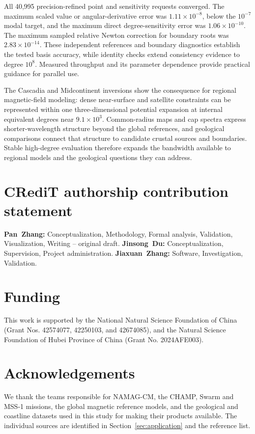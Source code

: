 ﻿\documentclass[11pt,a4paper]{article}
\begin{document}
All 40,995 precision-refined point and sensitivity requests converged. The maximum scaled value or angular-derivative error was $1.11\times10^{-8}$, below the $10^{-7}$ modal target, and the maximum direct degree-sensitivity error was $1.06\times10^{-10}$. The maximum sampled relative Newton correction for boundary roots was $2.83\times10^{-14}$. These independent references and boundary diagnostics establish the tested basis accuracy, while identity checks extend consistency evidence to degree $10^8$. Measured throughput and its parameter dependence provide practical guidance for parallel use.

The Cascadia and Midcontinent inversions show the consequence for regional magnetic-field modeling: dense near-surface and satellite constraints can be represented within one three-dimensional potential expansion at internal equivalent degrees near $9.1\times10^3$. Common-radius maps and cap spectra express shorter-wavelength structure beyond the global references, and geological comparisons connect that structure to candidate crustal sources and boundaries. Stable high-degree evaluation therefore expands the bandwidth available to regional models and the geological questions they can address.

\section*{CRediT authorship contribution statement}
\textbf{Pan~Zhang:} Conceptualization, Methodology, Formal analysis, Validation, Visualization, Writing -- original draft.
\textbf{Jinsong~Du:} Conceptualization, Supervision, Project administration.
\textbf{Jiaxuan~Zhang:} Software, Investigation, Validation.

\section*{Funding}
This work is supported by the National Natural Science Foundation of China (Grant Nos. 42574077, 42250103, and 42674085), and the Natural Science Foundation of Hubei Province of China (Grant No. 2024AFE003).

\section*{Acknowledgements}
We thank the teams responsible for NAMAG-CM, the CHAMP, Swarm and MSS-1 missions, the global magnetic reference models, and the geological and coastline datasets used in this study for making their products available. The individual sources are identified in Section~\ref{sec:application} and the reference list.
\end{document}
